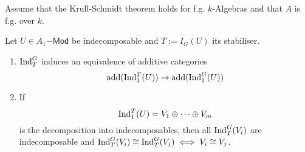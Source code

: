 
\begin{theorem}
Assume that the Krull-Schmidt theorem holds for f.g. $k$-Algebras and that $A$ is f.g. over $k$.

Let $U\in A_1\mathsf{-Mod}$ be indecomposable and $T:=I_G(U)$ its stabiliser.

\begin{enumerate}
\item $\operatorname{Ind}_T^ G$ induces an equivalence of additive categories
\[\operatorname{add}(\operatorname{Ind}_1^T(U)) \to \operatorname{add}(\operatorname{Ind}_1^G(U))\]
\item If 
\[\operatorname{Ind}_1^T(U)=V_1 \oplus \cdots \oplus V_m\]
is the decomposition into indecomposables, then all $\operatorname{Ind}_T^G(V_i)$ are indecomposable and $\operatorname{Ind}_T^G(V_i) \cong \operatorname{Ind}_T^G(V_j) \iff V_i \cong V_j$.
\end{enumerate}
\end{theorem}
